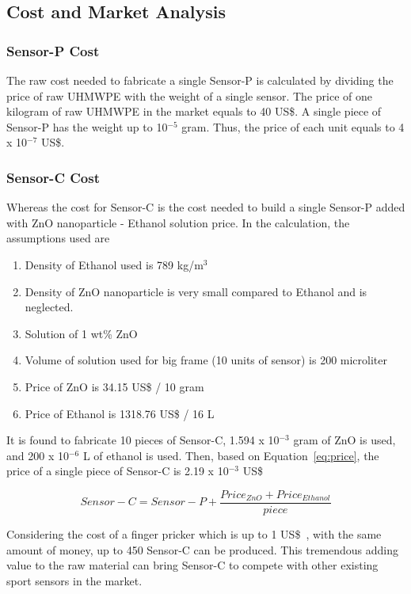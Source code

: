 \documentclass[journal]{IEEEtran}
\begin{document}
\subsection{Cost and Market Analysis}
\subsubsection{Sensor-P Cost}

The raw cost needed to fabricate a single Sensor-P is calculated by dividing the price of raw UHMWPE with the weight of a single sensor. The price of one kilogram of raw UHMWPE in the market equals to 40 US\$. A single piece of Sensor-P has the weight up to 10$^{-5}$ gram. Thus, the price of each unit equals to 4 x 10$^{-7}$ US\$.

\subsubsection{Sensor-C Cost}
Whereas the cost for Sensor-C is the cost needed to build a single Sensor-P added with ZnO nanoparticle - Ethanol solution price. In the calculation, the assumptions used are 
\begin{enumerate}
    \item Density of Ethanol used is 789 kg/m$^3$
    \item Density of ZnO nanoparticle is very small compared to Ethanol and is neglected.
    \item Solution of 1 wt\% ZnO
    \item Volume of solution used for big frame (10 units of sensor) is 200 microliter 
    \item Price of ZnO is 34.15 US\$ / 10 gram~\cite{Sigma38}
    \item Price of Ethanol is 1318.76 US\$ / 16 L~\cite{Sigma39}
\end{enumerate}

It is found to fabricate 10 pieces of Sensor-C, 1.594 x 10$^{-3}$ gram of ZnO is used, and 200 x 10$^{-6}$ L of ethanol is used. Then, based on Equation~\ref{eq:price}, the price of a single piece of Sensor-C is 2.19 x 10$^{-3}$ US\$

\begin{equation}
    Sensor-C = Sensor-P + \frac{Price_{ZnO} + Price_{Ethanol}}{piece} 
    \label{eq:price}
\end{equation}

Considering the cost of a finger pricker which is up to 1 US\$~\cite{Blood}, with the same amount of money, up to 450 Sensor-C can be produced. This tremendous adding value to the raw material can bring Sensor-C to compete with other existing sport sensors in the market.
\end{document}
